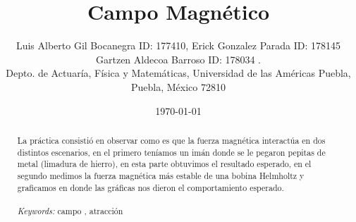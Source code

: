 \documentclass{article}
\begin{document}

\renewcommand{\footrulewidth}{1pt}
\renewcommand{\tablename}{Tabla}
\renewcommand{\figurename}{Figura}


\title{Campo Magnético}
\author{\small{Luis Alberto Gil Bocanegra ID: 177410, Erick Gonzalez Parada ID: 178145}\\
 \small{Gartzen Aldecoa Barroso ID: 178034 .}\\		%
	   \small{Depto. de Actuaría, Física y Matemáticas, Universidad de las Américas Puebla, Puebla, M\'exico 72810}}
\date{\small{\today}}

\maketitle


\begin{abstract}
La práctica consistió en observar como es que la fuerza magnética interactúa en dos distintos escenarios, en el primero 
teníamos un imán donde se le pegaron pepitas de metal (limadura de hierro), en esta parte obtuvimos el resultado esperado, en el
segundo medimos la fuerza magnética más estable de una bobina Helmholtz y graficamos en donde las gráficas nos dieron el comportamiento esperado. 
\\
\\
{\it Keywords:} campo , atracción  
\\
\\
\end{abstract}
\end{document}
